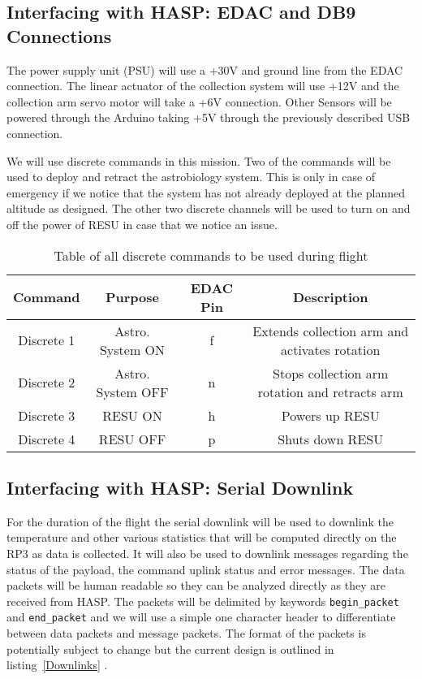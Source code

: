 \subsection{Interfacing with HASP: EDAC and DB9 Connections}

The power supply unit (PSU) will use a +30V and ground line from the EDAC connection. The linear actuator of the collection system will use +12V and the collection arm servo motor will take a +6V connection. Other Sensors will be powered through the Arduino taking +5V through the previously described USB connection.  

We will use discrete commands in this mission.  Two of the commands will be used to deploy and retract the astrobiology system.  This is only in case of emergency if we notice that the system has not already deployed at the planned altitude as designed. The other two discrete channels will be used to turn on and off the power of RESU in case that we notice an issue.

\begin{table}[!ht]
  \centering
  \caption{Table of all discrete commands to be used during flight} 
  \label{tab:Dis-Commands}
  \bigskip
  \begin{tabular}{c|c|c|c}
    \multicolumn{1}{c|}{\bfseries Command} & \multicolumn{1}{c|}{\bfseries Purpose} &  \multicolumn{1}{c|}{\bfseries EDAC Pin} & \multicolumn{1}{c}{\bfseries Description} \\
      \hline
      \hline
      Discrete 1 & Astro. System ON & f & Extends collection arm and activates rotation \\
      Discrete 2 & Astro. System OFF & n & Stops collection arm rotation and retracts arm \\
      Discrete 3 & RESU ON & h & Powers up RESU \\
      Discrete 4 & RESU OFF & p & Shuts down RESU \\
  \end{tabular}
  \medskip
\end{table}

\subsection{Interfacing with HASP: Serial Downlink}
For the duration of the flight the serial downlink will be used to downlink the temperature and other various statistics that will be computed directly on the RP\num{3} as data is collected. It will also be used to downlink messages regarding the status of the payload, the command uplink status and error messages. The data packets will be human readable so they can be analyzed directly as they are received from HASP. The packets will be delimited by keywords \verb|begin_packet| and \verb|end_packet| and we will use a simple one character header to differentiate between data packets and message packets. The format of the packets is potentially subject to change but the current design is outlined in listing~\ref{Downlinks} .
